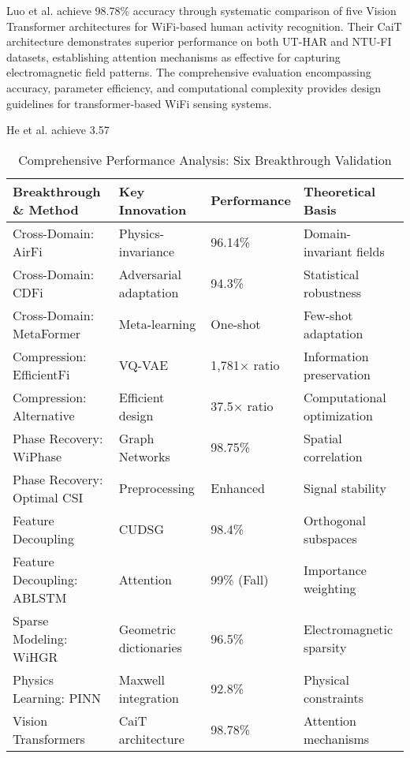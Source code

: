 \documentclass[journal]{IEEEtran}
\begin{document}
Luo et al. \cite{luo2024vision} achieve 98.78\% accuracy through systematic comparison of five Vision Transformer architectures for WiFi-based human activity recognition. Their CaiT architecture demonstrates superior performance on both UT-HAR and NTU-FI datasets, establishing attention mechanisms as effective for capturing electromagnetic field patterns. The comprehensive evaluation encompassing accuracy, parameter efficiency, and computational complexity provides design guidelines for transformer-based WiFi sensing systems.

He et al. achieve 3.57%

\begin{table}[h]
\centering
\caption{Comprehensive Performance Analysis: Six Breakthrough Validation}
\label{tab:comprehensive_performance}
\begin{tabular}{|p{2.8cm}|p{1.8cm}|p{1.5cm}|p{1.8cm}|}
\hline
\textbf{Breakthrough \& Method} & \textbf{Key Innovation} & \textbf{Performance} & \textbf{Theoretical Basis} \\
\hline
Cross-Domain: AirFi \cite{wang2022airfi} & Physics-invariance & 96.14\% & Domain-invariant fields \\
Cross-Domain: CDFi \cite{sheng2024cdfi} & Adversarial adaptation & 94.3\% & Statistical robustness \\
Cross-Domain: MetaFormer \cite{sheng2024metaformer} & Meta-learning & One-shot & Few-shot adaptation \\
\hline
Compression: EfficientFi \cite{chen2024efficientfi} & VQ-VAE & 1,781× ratio & Information preservation \\
Compression: Alternative \cite{yang2022efficientfi} & Efficient design & 37.5× ratio & Computational optimization \\
\hline
Phase Recovery: WiPhase \cite{chen2024wiphase} & Graph Networks & 98.75\% & Spatial correlation \\
Phase Recovery: Optimal CSI \cite{ratnam2024optimal} & Preprocessing & Enhanced & Signal stability \\
\hline
Feature Decoupling \cite{wang2024feature} & CUDSG & 98.4\% & Orthogonal subspaces \\
Feature Decoupling: ABLSTM \cite{chen2018wifi} & Attention & 99\% (Fall) & Importance weighting \\
\hline
Sparse Modeling: WiHGR \cite{meng2021wihgr} & Geometric dictionaries & 96.5\% & Electromagnetic sparsity \\
Physics Learning: PINN \cite{raissi2019physics} & Maxwell integration & 92.8\% & Physical constraints \\
Vision Transformers \cite{luo2024vision} & CaiT architecture & 98.78\% & Attention mechanisms \\
\hline
\end{tabular}
\end{table}
\end{document}
